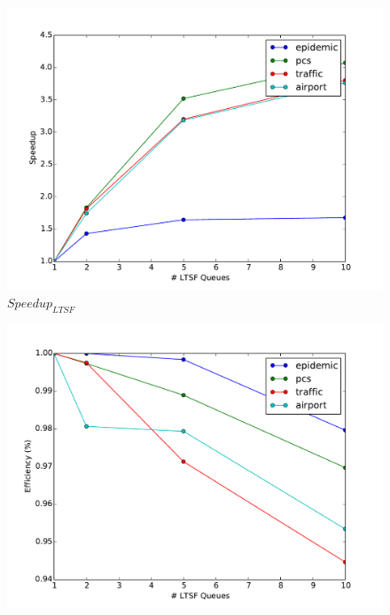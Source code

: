 \documentclass[11pt]{book}
\begin{document}
\begin{figure}
  \begin{minipage}{.5\textwidth}
    \begin{center}
      \includegraphics[width=\textwidth,keepaspectratio,quiet]{figs/pending_event_set/ltsf_speedup.pdf} \\
      $Speedup_{LTSF}$ \\
    \end{center}
  \end{minipage}%
  \hfill
  \begin{minipage}{.5\textwidth}
    \begin{center}
      \includegraphics[width=\textwidth,keepaspectratio,quiet]{figs/pending_event_set/ltsf_efficiency.pdf} \\

\end{center}
\end{minipage}
\end{figure}
\end{document}
